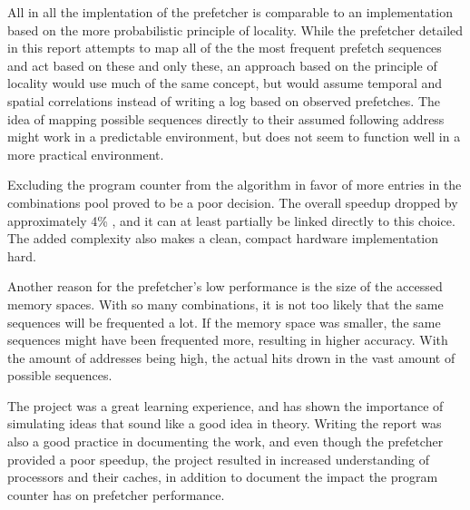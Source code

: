 All in all the implentation of the prefetcher is comparable to an implementation based on the more probabilistic principle of locality. While the prefetcher detailed in this report attempts to map all of the the most frequent prefetch sequences and act based on these and only these, an approach based on the principle of locality would use much of the same concept, but would assume temporal and spatial correlations instead of writing a log based on observed prefetches. The idea of mapping possible sequences directly to their assumed following address might work in a predictable environment, but does not seem to function well in a more practical environment. 

Excluding the program counter from the algorithm in favor of more entries in the combinations pool proved to be a poor decision. The overall speedup dropped by approximately 4\% , and it can at least partially be linked directly to this choice. The added complexity also makes a clean, compact hardware implementation hard. 

Another reason for the prefetcher's low performance is the size of the accessed memory spaces. With so many combinations, it is not too likely that the same sequences will be frequented a lot. If the memory space was smaller, the same sequences might have been frequented more, resulting in higher accuracy. With the amount of addresses being high, the actual hits drown in the vast amount of possible sequences.

The project was a great learning experience, and has shown the importance of simulating ideas that sound like a good idea in theory. Writing the report was also a good practice in documenting the work, and even though the prefetcher provided a poor speedup, the project resulted in increased understanding of processors and their caches, in addition to document the impact the program counter has on prefetcher performance.
